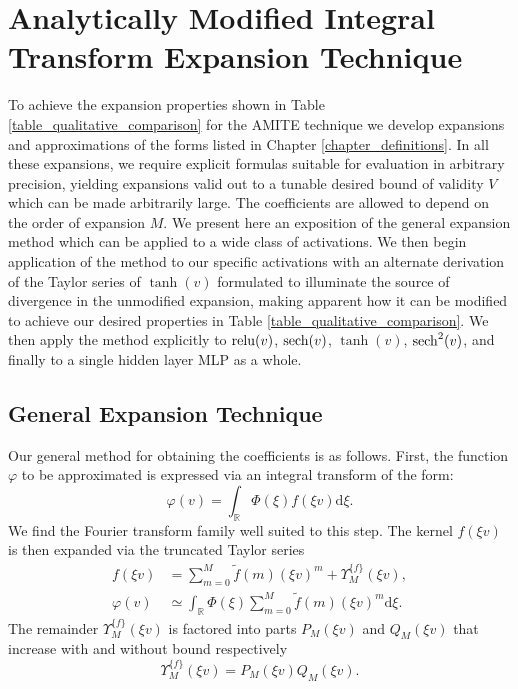 \chapter{Analytically Modified Integral Transform Expansion Technique}

\label{chapter_improved_expansions}

To achieve the expansion properties shown in Table
\ref{table_qualitative_comparison} for the AMITE technique
we develop expansions and approximations of the forms listed
in Chapter \ref{chapter_definitions}.  In all these expansions, we require
explicit formulas suitable for evaluation in arbitrary precision, yielding
expansions valid out to a tunable desired bound of validity $V$ which can be
made arbitrarily large.  The coefficients are allowed to depend on the order of
expansion $M$.
We present here an exposition of the general expansion
method which can be applied to a wide class of
activations.  We then begin application of the method
to our specific activations with an alternate
derivation of the Taylor series of $\tanh(v)$
formulated to illuminate the source of divergence in the
unmodified expansion, making apparent how it can be
modified to achieve our desired properties in Table
\ref{table_qualitative_comparison}.  We then apply the
method explicitly to $\operatorname{relu}(v)$, $\operatorname{sech}(v)$, $\tanh(v)$, $\operatorname{sech}^2(v)$,
and finally to a single hidden layer MLP as a whole.

\section{General Expansion Technique}
\label{section_method_technique}
Our general method for obtaining the coefficients
is as follows.  First, the function $\varphi$ to be
approximated is expressed via an integral transform of the form:
\begin{equation}
	\varphi(v) = \int_\mathbb{R} \! \Phi(\xi) f(\xi v) \mathrm{d}\xi.
\end{equation}
We find the Fourier transform family well suited to this step.
The kernel $f(\xi v)$ is then expanded via the truncated Taylor series
\begin{align}
	f(\xi v) &= \sum_{m=0}^M \tilde{f}(m) (\xi v)^m
	+ \Upsilon_M^{\{f\}}(\xi v),
	\label{eq_taylor_f} \\
	\varphi(v) &\simeq \int_\mathbb{R} \!
	\Phi(\xi) \sum_{m=0}^M \tilde{f}(m) (\xi v)^m \mathrm{d}\xi.
	\label{eq_phi_v_integral}
\end{align}
The remainder $\Upsilon_M^{\{f\}}(\xi v)$ is factored into parts
$P_M(\xi v)$ and $Q_M(\xi v)$
that increase with and without bound respectively
\begin{equation}
	\label{eq_remainder_factorization}
	\Upsilon_M^{\{f\}}(\xi v) = P_M(\xi v) Q_M(\xi v) .
\end{equation}

